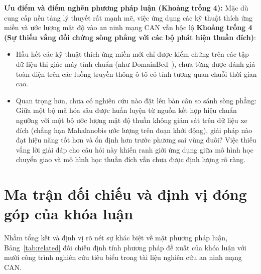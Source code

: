 \documentclass[12pt, a4paper, reqno, oneside]{book}
\begin{document}
\textbf{Ưu điểm và điểm nghẽn phương pháp luận (Khoảng trống 4):}
Mặc dù cung cấp nền tảng lý thuyết rất mạnh mẽ, việc ứng dụng các kỹ thuật thích ứng miền và ước lượng mật độ vào an ninh mạng CAN vẫn bộc lộ \textbf{Khoảng trống 4 (Sự thiếu vắng đối chứng sòng phẳng với các bộ phát hiện thuần đích)}:
\begin{itemize}
    \item Hầu hết các kỹ thuật thích ứng miền mới chỉ được kiểm chứng trên các tập dữ liệu thị giác máy tính chuẩn (như DomainBed~\cite{gulrajani2021domainbed}), chưa từng được đánh giá toàn diện trên các luồng truyền thông ô tô có tính tương quan chuỗi thời gian cao.
    \item Quan trọng hơn, chưa có nghiên cứu nào đặt lên bàn cân so sánh sòng phẳng: Giữa một bộ mã hóa sâu được huấn luyện từ nguồn kết hợp hiệu chuẩn ngưỡng với một bộ ước lượng mật độ thuần không giám sát trên dữ liệu xe đích (chẳng hạn Mahalanobis ước lượng trên đoạn khởi động), giải pháp nào đạt hiệu năng tốt hơn và ổn định hơn trước phương sai vùng đuôi? Việc thiếu vắng lời giải đáp cho câu hỏi này khiến ranh giới ứng dụng giữa mô hình học chuyển giao và mô hình học thuần đích vẫn chưa được định lượng rõ ràng.
\end{itemize}

\section{Ma trận đối chiếu và định vị đóng góp của khóa luận}
Nhằm tổng kết và định vị rõ nét sự khác biệt về mặt phương pháp luận, Bảng~\ref{tab:related} đối chiếu định tính phương pháp đề xuất của khóa luận với mười công trình nghiên cứu tiêu biểu trong tài liệu nghiên cứu an ninh mạng CAN.
\end{document}
